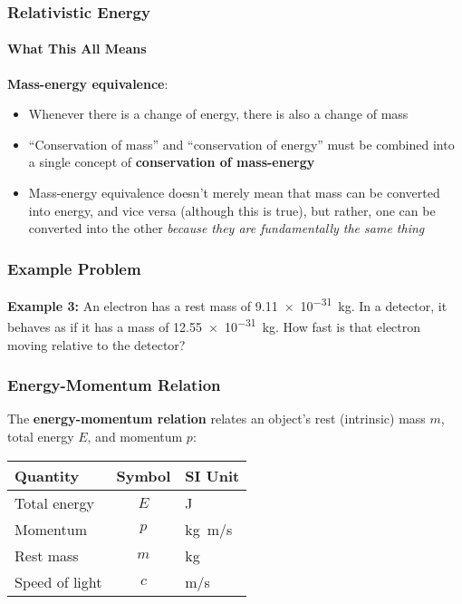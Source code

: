 \documentclass[12pt,compress,aspectratio=169]{beamer}
\newcommand{\eq}[2]{\vspace{#1}{\Large\begin{displaymath}#2\end{displaymath}}}
\begin{document}
\begin{frame}
  \frametitle{Relativistic Energy}
  \framesubtitle{What This All Means}
  
  \eq{-.2in}{
    \boxed{E=mc^2}
  }

  \textbf{Mass-energy equivalence}:
  \begin{itemize}
  \item Whenever there is a change of energy, there is also a change of mass
  \item ``Conservation of mass'' and ``conservation of energy'' must be
    combined into a single concept of \textbf{conservation of mass-energy}
  \item Mass-energy equivalence doesn't merely mean that mass can be converted
    into energy, and vice versa (although this is true), but rather, one can be
    converted into the other
    \emph{because they are fundamentally the same thing}
  \end{itemize}
\end{frame}



\begin{frame}
  \frametitle{Example Problem}
  \textbf{Example 3:} An electron has a rest mass of \SI{9.11e-31}{\kilo\gram}.
  In a detector, it behaves as if it has a mass of \SI{12.55e-31}{\kilo\gram}.
  How fast is that electron moving relative to the detector?
\end{frame}


\begin{frame}
  \frametitle{Energy-Momentum Relation}
  The \textbf{energy-momentum relation} relates an object's rest (intrinsic)
  mass $m$, total energy $E$, and momentum $p$:

  \eq{-.2in}{
    \boxed{E^2=p^2c^2+m^2c^4}
  }
  \begin{center}
    \begin{tabular}{l|c|l}
      \rowcolor{pink}
      \textbf{Quantity} & \textbf{Symbol} & \textbf{SI Unit} \\ \hline
      Total energy   & $E$ & \si{\joule} \\
      Momentum       & $p$ & \si{\kilo\gram.\metre/\second}\\
      Rest mass      & $m$ & \si{\kilo\gram} \\
      Speed of light & $c$ & \si{\metre/\second}
    \end{tabular}
  \end{center}
\end{frame}
\end{document}
